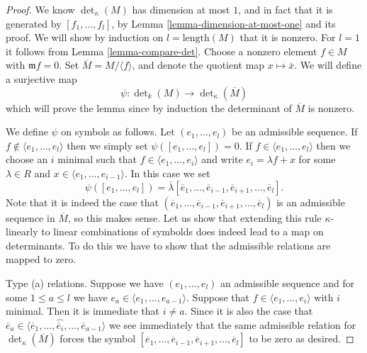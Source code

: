 \begin{proof}
We know $\det_\kappa(M)$ has dimension at most $1$, and in fact that it
is generated by $[f_1, \ldots, f_l]$, by
Lemma \ref{lemma-dimension-at-most-one} and its proof.
We will show by induction on $l = \text{length}(M)$
that it is nonzero. For $l = 1$ it follows from Lemma \ref{lemma-compare-det}.
Choose a nonzero element $f \in M$
with $\mathfrak m f = 0$. Set $\overline{M} = M /\langle f \rangle$,
and denote the quotient map $x \mapsto \overline{x}$.
We will define a surjective map
$$
\psi : \det\nolimits_k(M) \to \det\nolimits_\kappa(\overline{M})
$$
which will prove the lemma since by induction the determinant of
$\overline{M}$ is nonzero.

\medskip\noindent
We define $\psi$ on symbols as follows.
Let $(e_1, \ldots, e_l)$ be an admissible sequence.
If $f \not \in \langle e_1, \ldots, e_l \rangle$ then 
we simply set $\psi([e_1, \ldots, e_l]) = 0$.
If $f \in \langle e_1, \ldots, e_l \rangle$ then we choose
an $i$ minimal such that $f \in \langle e_1, \ldots, e_i \rangle$
and write $e_i = \lambda f + x$ for some $\lambda \in R$
and $x \in \langle e_1, \ldots, e_{i - 1} \rangle$.
In this case we set
$$
\psi([e_1, \ldots, e_l]) =
\overline{\lambda}[\overline{e}_1, \ldots,
\overline{e}_{i - 1},
\overline{e}_{i + 1}, \ldots, \overline{e}_l].
$$
Note that it is indeed the case that
$(\overline{e}_1, \ldots,
\overline{e}_{i - 1},
\overline{e}_{i + 1}, \ldots, \overline{e}_l)$
is an admissible sequence in $\overline{M}$, so this makes sense.
Let us show that extending this rule $\kappa$-linearly to
linear combinations of symbolds does indeed lead to a map on
determinants. To do this we have to show that the admissible
relations are mapped to zero.

\medskip\noindent
Type (a) relations. Suppose we have $(e_1, \ldots, e_l)$ an
admissible sequence and for some $1 \leq a \leq l$ we have
$e_a \in \langle e_1, \ldots, e_{a - 1}\rangle$.
Suppose that $f \in \langle e_1, \ldots, e_i\rangle$ with $i$ minimal.
Then it is immediate that $i \not = a$. Since it is also
the case that
$\overline{e}_a \in
\langle \overline{e}_1, \ldots, \hat{\overline{e}_i}, \ldots,
\overline{e}_{a - 1}\rangle$ we see immediately that the same
admissible relation for $\det_\kappa(\overline{M})$ forces
the symbol $[\overline{e}_1, \ldots,
\overline{e}_{i - 1},
\overline{e}_{i + 1}, \ldots, \overline{e}_l]$
to be zero as desired.


\end{proof}
